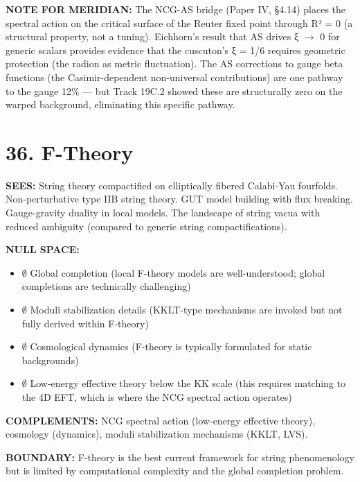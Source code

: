 \textbf{NOTE FOR MERIDIAN:} The NCG-AS bridge (Paper IV, §4.14) places the spectral action on the critical surface of the Reuter fixed point through R² = 0 (a structural property, not a tuning). Eichhorn's result that AS drives ξ $\rightarrow$ 0 for generic scalars provides evidence that the cuscuton's ξ = 1/6 requires geometric protection (the radion as metric fluctuation). The AS corrections to gauge beta functions (the Casimir-dependent non-universal contributions) are one pathway to the gauge 12\% — but Track 19C.2 showed these are structurally zero on the warped background, eliminating this specific pathway.


\bigskip\noindent\makebox[\textwidth]{\color{rulegray}\rule{5cm}{0.3pt}}\bigskip


\section*{36. F-Theory}


\textbf{SEES:} String theory compactified on elliptically fibered Calabi-Yau fourfolds. Non-perturbative type IIB string theory. GUT model building with flux breaking. Gauge-gravity duality in local models. The landscape of string vacua with reduced ambiguity (compared to generic string compactifications).


\textbf{NULL SPACE:}

\begin{itemize}[nosep,leftmargin=*]
  \item $\emptyset$ Global completion (local F-theory models are well-understood; global completions are technically challenging)
  \item $\emptyset$ Moduli stabilization details (KKLT-type mechanisms are invoked but not fully derived within F-theory)
  \item $\emptyset$ Cosmological dynamics (F-theory is typically formulated for static backgrounds)
  \item $\emptyset$ Low-energy effective theory below the KK scale (this requires matching to the 4D EFT, which is where the NCG spectral action operates)
\end{itemize}


\textbf{COMPLEMENTS:} NCG spectral action (low-energy effective theory), cosmology (dynamics), moduli stabilization mechanisms (KKLT, LVS).


\textbf{BOUNDARY:} F-theory is the best current framework for string phenomenology but is limited by computational complexity and the global completion problem.


